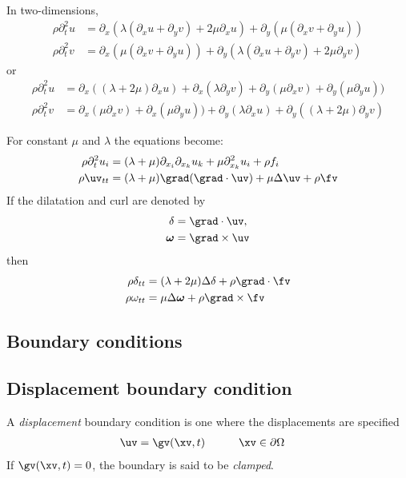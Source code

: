 \documentclass[11pt]{article}
\newcommand{\omegav}{\boldsymbol{\omega}}
\begin{document}
In two-dimensions,
\begin{align}
  \rho \partial_t^2 u &= \partial_x( \lambda( \partial_x u + \partial_y v) + 2\mu \partial_x u ) 
                        +\partial_y( \mu( \partial_x v + \partial_y u )) \\
   \rho \partial_t^2 v &= \partial_x( \mu( \partial_x v + \partial_y u )) 
                        +\partial_y( \lambda( \partial_x u + \partial_y v) + 2\mu \partial_y v ) 
\end{align}
or
\begin{align}
  \rho \partial_t^2 u &= \partial_x( (\lambda+ 2\mu) \partial_x u) + \partial_x(\lambda\partial_y v)  
                        +\partial_y( \mu \partial_x v)  +\partial_y( \mu \partial_y u )) \\
   \rho \partial_t^2 v &= \partial_x( \mu\partial_x v) + \partial_x( \mu\partial_y u )) 
                        +\partial_y( \lambda \partial_x u) +\partial_y( (\lambda+2\mu) \partial_y v ) 
\end{align}





For constant $\mu$ and $\lambda$ the equations become: 
\begin{align}
  \rho \partial_t^2 u_i &= (\lambda+\mu) \partial_{x_i} \partial_{x_k} u_k + \mu \partial_{x_k}^2 u_i  +\rho f_i \\
  \rho \uv_{tt} &= (\lambda+\mu) \grad(\grad\cdot\uv) + \mu \Delta \uv + \rho \fv 
\end{align}
If the dilatation and curl are denoted by
\begin{align}
  \delta &= \grad\cdot\uv , \\
  \omegav &= \grad\times\uv
\end{align}
then
\begin{align}
  \rho \delta_{tt} &= (\lambda+2\mu) \Delta \delta +\rho\grad\cdot\fv \\
  \rho \omega_{tt} &= \mu \Delta \omegav + \rho \grad\times\fv 
\end{align}


\subsection{Boundary conditions}

\subsection{Displacement boundary condition}
A {\em displacement} boundary condition is one where the displacements are specified
\begin{alignat}{2}
  \uv &= \gv(\xv,t) &&\qquad \xv\in\partial\Omega
\end{alignat}
If $\gv(\xv,t)=0$, the boundary is said to be {\em clamped}.
\end{document}
